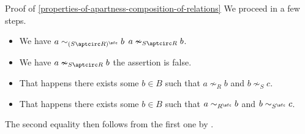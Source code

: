\begin{Proof}{Proof of \cref{properties-of-apartness-composition-of-relations}}
    We proceed in a few steps.
    \begin{itemize}
        \item We have $a\sim_{(S\aptcirc R)^{\sfc}}b$ \textiff $a\nsim_{S\aptcirc R}b$.
        \item We have $a\nsim_{S\aptcirc R}b$ \textiff the assertion  is false.
        \item That happens \textiff there exists some $b\in B$ such that $a\nsim_{R}b$ and $b\nsim_{S}c$.
        \item That happens \textiff there exists some $b\in B$ such that $a\sim_{R^{\sfc}}b$ and $b\sim_{S^{\sfc}}c$.
    \end{itemize}
    The second equality then follows from the first one by .


\end{Proof}
